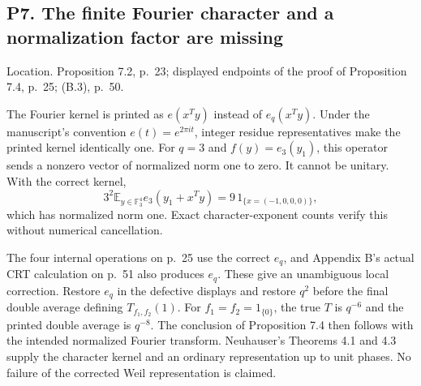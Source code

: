 \documentclass[10pt]{article}
\begin{document}
\subsection*{P7. The finite Fourier character and a normalization factor are missing}
Location. Proposition 7.2, p. 23; displayed endpoints of the proof of Proposition 7.4, p. 25; (B.3), p. 50.\par
The Fourier kernel is printed as \(e(x^Ty)\) instead of \(e_q(x^Ty)\). Under the manuscript’s convention \(e(t)=e^{2\pi i t}\), integer residue representatives make the printed kernel identically one. For \(q=3\) and \(f(y)=e_3(y_1)\), this operator sends a nonzero vector of normalized norm one to zero. It cannot be unitary. With the correct kernel, \[3^2\mathbb E_{y\in\mathbb F_3^4} e_3(y_1+x^Ty)
 =9\,1_{\{x=(-1,0,0,0)\}},\] which has normalized norm one. Exact character-exponent counts verify this without numerical cancellation.\par
The four internal operations on p. 25 use the correct \(e_q\), and Appendix B’s actual CRT calculation on p. 51 also produces \(e_q\). These give an unambiguous local correction. Restore \(e_q\) in the defective displays and restore \(q^2\) before the final double average defining \(T_{f_1,f_2}(1)\). For \(f_1=f_2=1_{\{0\}}\), the true \(T\) is \(q^{-6}\) and the printed double average is \(q^{-8}\). The conclusion of Proposition 7.4 then follows with the intended normalized Fourier transform. Neuhauser’s Theorems 4.1 and 4.3 supply the character kernel and an ordinary representation up to unit phases. No failure of the corrected Weil representation is claimed.\par
\end{document}
